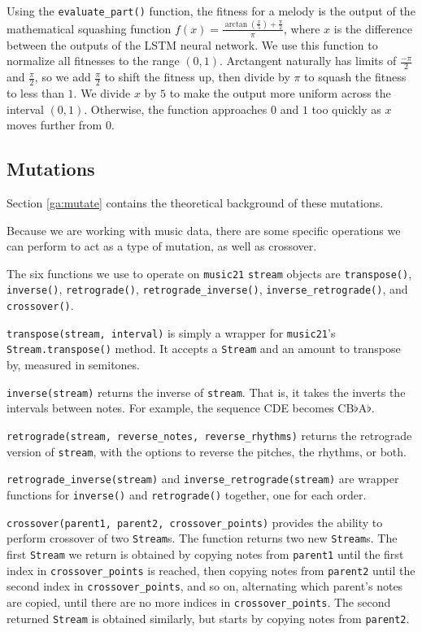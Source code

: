 Using the \texttt{evaluate\_part()} function, the fitness for a melody is the output of the mathematical squashing function $f(x) = \frac{\arctan(\frac{x}{5}) + \frac{\pi}{2}}{\pi}$, where $x$ is the difference between the outputs of the LSTM neural network.
We use this function to normalize all fitnesses to the range $(0,1)$.
Arctangent naturally has limits of $\frac{-\pi}{2}$ and $\frac{\pi}{2}$, so we add $\frac{\pi}{2}$ to shift the fitness up, then divide by $\pi$ to squash the fitness to less than $1$.
We divide $x$ by $5$ to make the output more uniform across the interval $(0,1)$.
Otherwise, the function approaches $0$ and $1$ too quickly as $x$ moves further from $0$.

\subsection{Mutations} \label{software:ga:mutations}

Section \ref{ga:mutate} contains the theoretical background of these mutations.

Because we are working with music data, there are some specific operations we can perform to act as a type of mutation, as well as crossover.

The six functions we use to operate on \texttt{music21} \texttt{stream} objects are \texttt{transpose()}, \texttt{inverse()}, \texttt{retrograde()}, \texttt{retrograde\_inverse()}, \texttt{inverse\_retrograde()}, and \texttt{crossover()}.

\texttt{transpose(stream, interval)} is simply a wrapper for \texttt{music21}'s \texttt{Stream.transpose()} method.
It accepts a \texttt{Stream} and an amount to transpose by, measured in semitones.

\texttt{inverse(stream)} returns the inverse of \texttt{stream}.
That is, it takes the inverts the intervals between notes.
For example, the sequence CDE becomes CB$\flat$A$\flat$.

\texttt{retrograde(stream, reverse\_notes, reverse\_rhythms)} returns the retrograde version of \texttt{stream}, with the options to reverse the pitches, the rhythms, or both.

\texttt{retrograde\_inverse(stream)} and \texttt{inverse\_retrograde(stream)} are wrapper functions for \texttt{inverse()} and \texttt{retrograde()} together, one for each order.

\texttt{crossover(parent1, parent2, crossover\_points)} provides the ability to perform crossover of two \texttt{Stream}s.
The function returns two new \texttt{Stream}s.
The first \texttt{Stream} we return is obtained by copying notes from \texttt{parent1} until the first index in \texttt{crossover\_points} is reached, then copying notes from \texttt{parent2} until the second index in \texttt{crossover\_points}, and so on, alternating which parent's notes are copied, until there are no more indices in \texttt{crossover\_points}.
The second returned \texttt{Stream} is obtained similarly, but starts by copying notes from \texttt{parent2}.


